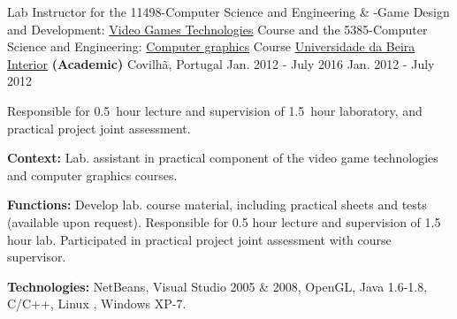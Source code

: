 \begin{cventries}
  \cventry
    {Lab Instructor for the
        11498-Computer Science and Engineering \& -Game Design and Development: 
		\href{http://www.di.ubi.pt/~agomes/tjv/}{Video Games Technologies}	Course 
		\linebreak and the
		5385-Computer Science and Engineering: 		
		\href{http://www.di.ubi.pt/~agomes/cg/}{Computer graphics} Course} %
    {\href{http://www.ubi.pt}{Universidade da Beira Interior} \textbf{(Academic)}} %
    {Covilh\~a, Portugal} %
    {\linebreak Jan. 2012 - July 2016 \linebreak Jan. 2012 - July 2012} %
    {
      \begin{cvitems} %
        \item[] {Responsible for 0.5~hour lecture and supervision of 1.5~hour laboratory, and practical project joint assessment.}%
		\item[] {\textbf{Context:} Lab. assistant in practical component of the video game technologies and computer graphics courses.}
		\item[] {\textbf{Functions:} Develop lab. course material, including practical sheets and tests (available upon request). Responsible for 0.5 hour lecture and supervision of 1.5 hour lab. Participated in practical project joint assessment with course supervisor.}
		\item[] {\textbf{Technologies:} 
		\textcolor{rainbowcolor-olive}{NetBeans}, 		
		\textcolor{rainbowcolor-olive}{Visual Studio 2005 \& 2008},
		\textcolor{rainbowcolor-indigo}{OpenGL}, 
		\textcolor{rainbowcolor-indigo}{Java 1.6-1.8},  
		\textcolor{rainbowcolor-indigo}{C/C++}, 
		\textcolor{rainbowcolor-orange}{Linux%
        }, 
		\textcolor{rainbowcolor-orange}{Windows XP-7}.}
      \end{cvitems}
    }        
    

\end{cventries}
